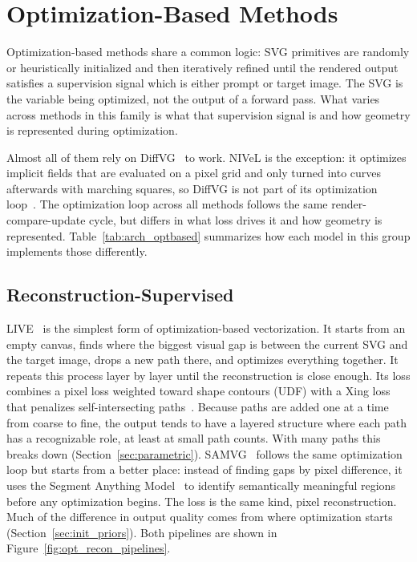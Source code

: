 \section{Optimization-Based Methods}
\label{sec:optimization}

Optimization-based methods share a common logic: SVG
primitives are randomly or heuristically
initialized and then iteratively refined until the rendered
output satisfies a supervision signal which is either prompt or target image.
The SVG is the variable being optimized, not the output of a forward pass.
What varies across methods in this family is what that
supervision signal is and how geometry is represented
during optimization.

Almost all of them rely on DiffVG~\cite{liDifferentiableVectorGraphics2020a} to work. 
NIVeL is the exception: it optimizes implicit fields that are evaluated on a pixel grid 
and only turned into curves afterwards with marching squares, so DiffVG is not part of 
its optimization loop~\cite{thamizharasanNIVeLNeuralImplicit2024}.
The optimization loop across all methods 
follows the same render-compare-update cycle, 
but differs in what loss drives it and how geometry is represented.
Table~\ref{tab:arch_optbased} summarizes how each 
model in this group implements those differently.

\subsection{Reconstruction-Supervised}

LIVE~\cite{maLayerwiseImageVectorization2022} is the simplest form of optimization-based vectorization. 
It starts from an empty canvas, finds where the biggest visual gap is between the current SVG and the target image, 
drops a new path there, and optimizes everything together. It repeats this process layer by layer until the reconstruction is close enough. 
Its loss combines a pixel loss weighted toward shape contours (UDF) with a Xing loss that penalizes self-intersecting paths~\cite{maLayerwiseImageVectorization2022}. 
Because paths are added one at a time from coarse to fine, the output tends to have a layered structure where each path has a recognizable role, 
at least at small path counts. With many paths this breaks down (Section~\ref{sec:parametric}). 
SAMVG~\cite{zhuSAMVGMultistageImage2023} follows the same optimization loop but starts from a better place: instead of finding gaps by 
pixel difference, it uses the Segment Anything Model~\cite{kirillovSegmentAnything2023} to identify semantically meaningful 
regions before any optimization begins. The loss is the same kind, pixel reconstruction. Much of the difference in output quality comes 
from where optimization starts (Section~\ref{sec:init_priors}). Both pipelines are shown in Figure~\ref{fig:opt_recon_pipelines}.

